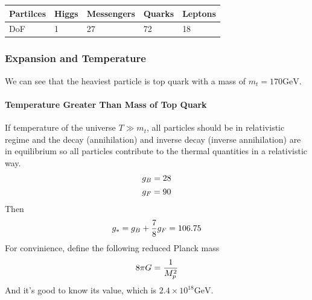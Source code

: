 \documentclass[letterpaper,10pt,english]{sphinxmanual}
\begin{document}
\begin{tabulary}{\linewidth}{|L|L|L|L|L|}
\hline
\textsf{\relax 
Partilces
} & \textsf{\relax 
Higgs
} & \textsf{\relax 
Messengers
} & \textsf{\relax 
Quarks
} & \textsf{\relax 
Leptons
}\\
\hline
DoF
 & 
1
 & 
27
 & 
72
 & 
18
\\
\hline\end{tabulary}



\subsubsection{Expansion and Temperature}
\label{Cosmology/cosmoIndex:expansion-and-temperature}
We can see that the heaviest particle is top quark with a mass of \(m_t = 170 \mathrm{GeV}\).


\paragraph{Temperature Greater Than Mass of Top Quark}
\label{Cosmology/cosmoIndex:temperature-greater-than-mass-of-top-quark}
If temperature of the universe \(T \gg m_t\), all particles should be in relativistic regime and the decay (annihilation) and inverse decay (inverse annihilation) are in equilibrium so all particles contribute to the thermal quantities in a relativistic way.
\begin{gather}
\begin{split}g_B = 28\end{split}\notag\\\begin{split}g_F = 90\end{split}\notag
\end{gather}
Then
\begin{gather}
\begin{split}g _ * = g_B + \frac{7}{8} g _ F = 106.75\end{split}\notag
\end{gather}
For convinience, define the following reduced Planck mass
\begin{gather}
\begin{split}8\pi G = \frac{1}{M _ p ^2}\end{split}\notag
\end{gather}
And it's good to know its value, which is \(2.4\times 10^{18} \mathrm{GeV}\).
\end{document}
